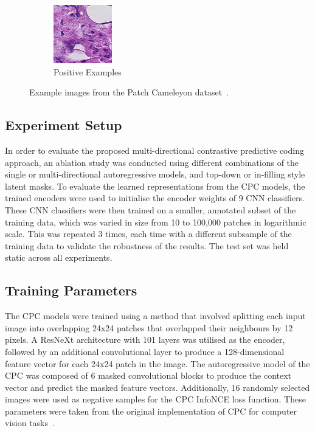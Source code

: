 \begin{figure}
\begin{subfigure}{\textwidth}
	\includegraphics[width=0.3\linewidth]{images/pcam_22_1.png}
	\caption{Positive Examples}
\end{subfigure}
	\caption{Example images from the Patch Cameleyon dataset~\citep{veeling2018rotation,litjens20181399}.}
	\label{fig:pcam_examples}
\end{figure}

\subsection{Experiment Setup}
\label{subsec:unsupervised_experiment}
In order to evaluate the proposed multi-directional contrastive predictive coding approach, an ablation study was conducted using different combinations of the single or multi-directional autoregressive models, and top-down or in-filling style latent masks. To evaluate the learned representations from the CPC models, the trained encoders were used to initialise the encoder weights of 9 CNN classifiers. These CNN classifiers were then trained on a smaller, annotated subset of the training data, which was varied in size from 10 to 100,000 patches in logarithmic scale. This was repeated 3 times, each time with a different subsample of the training data to validate the robustness of the results. The test set was held static across all experiments.

\subsection{Training Parameters}
\label{subsec:unsupervised_training}
The CPC models were trained using a method that involved splitting each input image into overlapping 24x24 patches that overlapped their neighbours by 12 pixels. A ResNeXt architecture with 101 layers was utilised as the encoder, followed by an additional convolutional layer to produce a 128-dimensional feature vector for each 24x24 patch in the image. The autoregressive model of the CPC was composed of 6 masked convolutional blocks to produce the context vector and predict the masked feature vectors. Additionally, 16 randomly selected images were used as negative samples for the CPC InfoNCE loss function. These parameters were taken from the original implementation of CPC for computer vision tasks~\citep{oord2018representation}.


